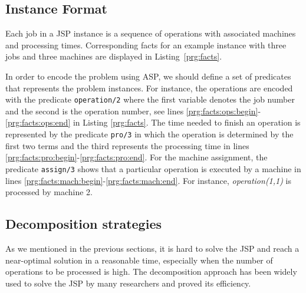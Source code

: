 \documentclass{tlp} %
\begin{document}
\subsection{Instance Format}\label{subsec:instance}
% 
%
Each job in a JSP instance is a sequence of operations with associated
machines and processing times.
Corresponding facts for an example instance with three jobs and three
machines are displayed in Listing~\ref{prg:facts}.

In order to encode the problem using ASP, we should define a set of predicates that represents the problem instances. For instance, the operations are encoded with the predicate \lstinline{operation/2} where the first variable denotes the job number and the second is the operation number, see lines \ref{prg:facts:ops:begin}-\ref{prg:facts:ops:end} in Listing \ref{prg:facts}. The time needed to finish an operation is represented by the predicate \lstinline{pro/3} in which the operation is determined by the first two terms and the third represents the processing time in lines \ref{prg:facts:pro:begin}-\ref{prg:facts:pro:end}. For the machine assignment, the predicate \lstinline{assign/3} shows that a particular operation is executed by a machine in lines \ref{prg:facts:mach:begin}-\ref{prg:facts:mach:end}. For instance, \emph{operation(1,1)} is processed by machine 2. 


\subsection{Decomposition strategies}
As we mentioned in the previous sections, it is hard to solve the JSP and reach a near-optimal solution in a reasonable time, especially when the number of operations to be processed is high. The decomposition approach has been widely used to solve the JSP by many researchers and proved its efficiency.
\end{document}
